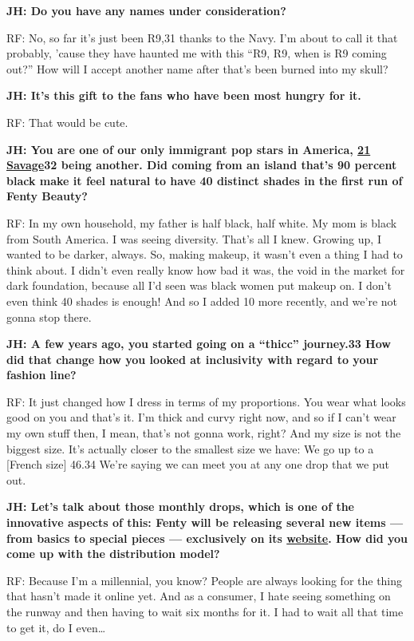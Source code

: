 \textbf{JH: Do you have any names under consideration?}

RF: No, so far it's just been R9,31 thanks to the Navy. I'm about to
call it that probably, 'cause they have haunted me with this ``R9, R9,
when is R9 coming out?'' How will I accept another name after that's
been burned into my skull?

\textbf{JH: It's this gift to the fans who have been most hungry for
it.}

RF: That would be cute.

\textbf{JH: You are one of our only immigrant pop stars in America,
\href{https://www.nytimes3xbfgragh.onion/2019/02/17/arts/music/21-savage-ice-interview.html}{21
Savage}32 being another. Did coming from an island that's 90 percent
black make it feel natural to have 40 distinct shades in the first run
of Fenty Beauty?}

RF: In my own household, my father is half black, half white. My mom is
black from South America. I was seeing diversity. That's all I knew.
Growing up, I wanted to be darker, always. So, making makeup, it wasn't
even a thing I had to think about. I didn't even really know how bad it
was, the void in the market for dark foundation, because all I'd seen
was black women put makeup on. I don't even think 40 shades is enough!
And so I added 10 more recently, and we're not gonna stop there.

\textbf{JH: A few years ago, you started going on a ``thicc'' journey.33
How did that change how you looked at inclusivity with regard to your
fashion line?}

RF: It just changed how I dress in terms of my proportions. You wear
what looks good on you and that's it. I'm thick and curvy right now, and
so if I can't wear my own stuff then, I mean, that's not gonna work,
right? And my size is not the biggest size. It's actually closer to the
smallest size we have: We go up to a {[}French size{]} 46.34 We're
saying we can meet you at any one drop that we put out.

\textbf{JH: Let's talk about those monthly drops, which is one of the
innovative aspects of this: Fenty will be releasing several new items
--- from basics to special pieces --- exclusively on its
\href{https://fenty.com/}{website}. How did you come up with the
distribution model?}

RF: Because I'm a millennial, you know? People are always looking for
the thing that hasn't made it online yet. And as a consumer, I hate
seeing something on the runway and then having to wait six months for
it. I had to wait all that time to get it, do I even\ldots{}

